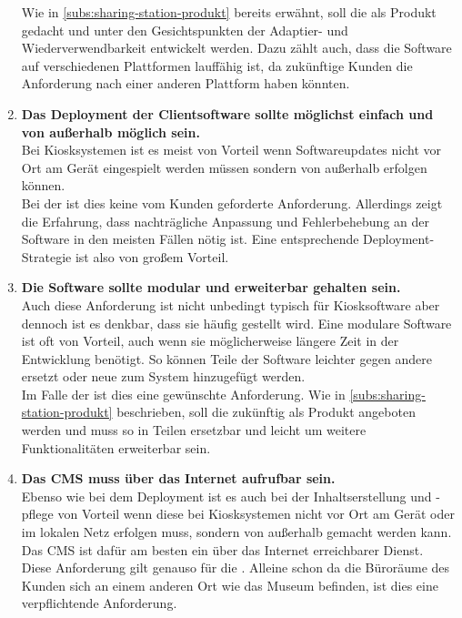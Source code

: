\begin{enumerate}[label=\textbf{NFA\arabic*}]
  Wie in \autoref{subs:sharing-station-produkt} bereits erwähnt, soll die \shst{} als Produkt gedacht und
  unter den Gesichtspunkten der Adaptier- und Wiederverwendbarkeit entwickelt werden. Dazu zählt auch, dass die Software
  auf verschiedenen Plattformen lauffähig ist, da zukünftige Kunden die Anforderung nach einer anderen Plattform
  haben könnten. 
  \item\label{nfa7} \textbf{Das Deployment der Clientsoftware sollte möglichst einfach und von außerhalb möglich sein.}\\
  Bei Kiosksystemen ist es meist von Vorteil wenn Softwareupdates nicht vor Ort am Gerät eingespielt werden 
  müssen sondern von außerhalb erfolgen können.\\
  Bei der \shst{} ist dies keine vom Kunden geforderte Anforderung. Allerdings zeigt die Erfahrung, dass nachträgliche
  Anpassung und Fehlerbehebung an der Software in den meisten Fällen nötig ist. Eine entsprechende Deployment-Strategie
  ist also von großem Vorteil.
  \item\label{nfa8} \textbf{Die Software sollte modular und erweiterbar gehalten sein.}\\
  Auch diese Anforderung ist nicht unbedingt typisch für Kiosksoftware aber dennoch ist es denkbar,
  dass sie häufig gestellt wird. 
  Eine modulare Software ist oft von Vorteil, auch wenn sie möglicherweise längere Zeit in der Entwicklung
  benötigt. So können Teile der Software leichter gegen andere ersetzt oder neue zum System hinzugefügt 
  werden.\\
  Im Falle der \shst{} ist dies eine gewünschte Anforderung. Wie in \autoref{subs:sharing-station-produkt} beschrieben,
  soll die \shst{} zukünftig als Produkt angeboten werden und muss so in Teilen ersetzbar
  und leicht um weitere Funktionalitäten erweiterbar sein. 
  \item\label{nfa9} \textbf{Das CMS muss über das Internet aufrufbar sein.}\\
  Ebenso wie bei dem Deployment ist es auch bei der Inhaltserstellung und -pflege von Vorteil wenn diese bei 
  Kiosksystemen nicht vor Ort am Gerät oder im lokalen Netz erfolgen muss, sondern von außerhalb gemacht 
  werden kann. Das CMS ist dafür am besten ein über das Internet erreichbarer Dienst.\\
  Diese Anforderung gilt genauso für die \shst{}. Alleine schon da die Büroräume des Kunden sich an einem 
  anderen Ort wie das Museum befinden, ist dies eine verpflichtende Anforderung.
\end{enumerate}
